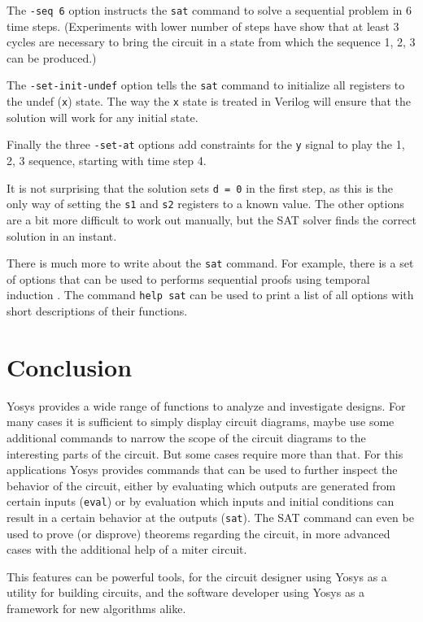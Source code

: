 \documentclass[9pt,technote,a4paper]{IEEEtran}
\begin{document}
The {\tt -seq 6} option instructs the {\tt sat} command to solve a sequential
problem in 6 time steps. (Experiments with lower number of steps have show that
at least 3 cycles are necessary to bring the circuit in a state from which
the sequence 1, 2, 3 can be produced.)

The {\tt -set-init-undef} option tells the {\tt sat} command to initialize
all registers to the undef ({\tt x}) state. The way the {\tt x} state
is treated in Verilog will ensure that the solution will work for any
initial state.

Finally the three {\tt -set-at} options add constraints for the {\tt y}
signal to play the 1, 2, 3 sequence, starting with time step 4.

It is not surprising that the solution sets {\tt d = 0} in the first step, as
this is the only way of setting the {\tt s1} and {\tt s2} registers to a known
value. The other options are a bit more difficult to work out manually, but
the SAT solver finds the correct solution in an instant.

\medskip

There is much more to write about the {\tt sat} command. For example, there is
a set of options that can be used to performs sequential proofs using temporal
induction \cite{tip}. The command {\tt help sat} can be used to print a list
of all options with short descriptions of their functions.

\section{Conclusion}
\label{conclusion}

Yosys provides a wide range of functions to analyze and investigate designs. For
many cases it is sufficient to simply display circuit diagrams, maybe use some
additional commands to narrow the scope of the circuit diagrams to the interesting
parts of the circuit. But some cases require more than that. For this applications
Yosys provides commands that can be used to further inspect the behavior of the
circuit, either by evaluating which outputs are generated from certain inputs
({\tt eval}) or by evaluation which inputs and initial conditions can result
in a certain behavior at the outputs ({\tt sat}). The SAT command can even be used
to prove (or disprove) theorems regarding the circuit, in more advanced cases
with the additional help of a miter circuit.

This features can be powerful tools, for the circuit designer using Yosys as a
utility for building circuits, and the software developer using Yosys as a
framework for new algorithms alike.
\end{document}
